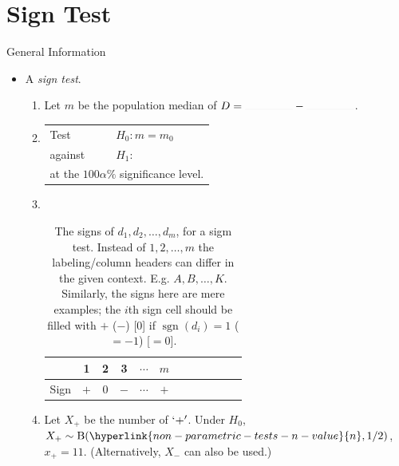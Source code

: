\documentclass[../Notes.tex]{subfiles}
\begin{document}
\section{Sign Test}
\begin{stbox}{General Information}
  \begin{itemize}
    \item A \emph{sign test}.
    \begin{enumerate}
      \item Let \(m\) be the population median of \(D=\rule{1.5cm}{0.01mm}-\rule{1.5cm}{0.01mm}\).
      \item 
      \begin{tabular}{|ll|}
        \hline
        Test & \(H_0\colon m=m_0\)\\
        against &\(H_1\colon\) 
        \begin{enumerate*}[itemjoin={\quad}]
          \item \(m<m_0\),
          \item \(m\neq m_0\),\quad or
          \item \(m>m_0\),
        \end{enumerate*}\\
        \multicolumn{2}{|l|}{at the \(100\alpha\%\) significance level.}\\
        \hline
      \end{tabular}
      \item ~
      \begin{table}[H]
        \centering
        \begin{tabular}{|Sc|Sc|Sc|Sc|Sc|Sc|}
           & 1 & 2 & 3 & \(\cdots\) & \(m\)\\
          \hline 
          Sign & \(+\) & \(0\) & \(-\) & \(\cdots\) & \(+\)\\
          \hline
        \end{tabular}
        \caption{The signs of \(d_1,d_2,\dots,d_m\), for a sigm test. Instead of \(1,2,\dots,m\) the labeling/column headers can differ in the given context. E.g. \(A,B,\dots,K\). Similarly, the signs here are mere examples; the \(i\)th sign cell should be filled with \(+\) (\(-\)) [0] if \(\operatorname{sgn}(d_i)=1\) (\(=-1\)) [\(=0\)].}
        \label{table:sign-test-working-table}
      \end{table}
      \item Let \(X_{+}\) be the number of \(`+'\). Under \(H_0\), \(X_{+}\sim\Binom(\hyperlink{non-parametric-tests-n-value}{n},1/2)\), \(x_{+}=11\). (Alternatively, \(X_{-}\) can also be used.)

\end{enumerate}
\end{itemize}
\end{stbox}
\end{document}
